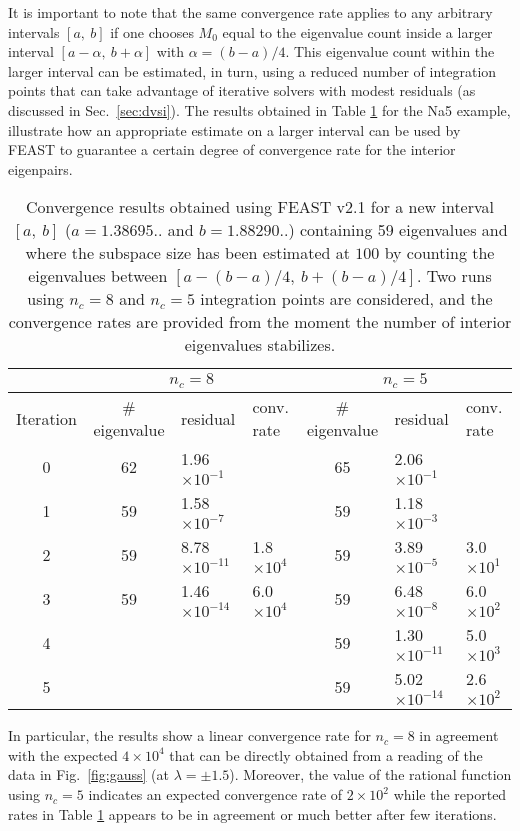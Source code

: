 \documentclass[12pt]{article}		\usepackage{tabls,multirow}
\newcommand{\ab}{[a, \ b]}
\begin{document}
It is important to note that the same convergence rate applies to any
arbitrary intervals $\ab$ if one chooses $M_0$ equal to the eigenvalue
count inside a larger interval $[a-\alpha, \ b+\alpha]$ with
$\alpha=(b-a)/4$. This eigenvalue count within the larger interval
can be estimated, in turn, using a reduced number of integration
points that can take advantage of iterative solvers with modest
residuals (as discussed in Sec.~\ref{sec:dvsi}).  The results obtained
in Table \ref{tab:feastruns} for the Na5 example, illustrate how an
appropriate estimate on a larger interval can be used by FEAST to
guarantee a certain degree of convergence rate for the interior
eigenpairs.
\begin{table}[htbp]
\begin{center}
\begin{small}
\begin{tabular}{c|cll|cll}
   \multicolumn{1}{c}{}    & \multicolumn{3}{c}{$n_c=8$} & \multicolumn{3}{c}{$n_c=5$} \\ \hline\hline
Iteration     & \# eigenvalue & residual & conv. rate &  \# eigenvalue & residual & conv. rate  \\
0   &    62   &   1.96$\times10^{-1}$ &                    & 65 & 2.06$\times10^{-1}$ &  \\
1   &    59   &   1.58$\times10^{-7}$ &                    & 59 &1.18$\times10^{-3}$ &   \\
2   &    59   &   8.78$\times10^{-11}$ & 1.8$\times10^{4}$  & 59 & 3.89$\times10^{-5}$ & 3.0$\times10^{1}$   \\
3   &    59   &   1.46$\times10^{-14}$ & 6.0$\times10^{4}$  & 59 & 6.48$\times10^{-8}$ & 6.0$\times10^{2}$  \\
4    &         &            &                             & 59 &1.30$\times10^{-11}$ & 5.0$\times10^{3}$   \\
5    &         &            &                             & 59 & 5.02$\times10^{-14}$ & 2.6$\times10^{2}$    \\ \hline \hline
\end{tabular}
\end{small}
\caption{\label{tab:feastruns} Convergence results obtained using
  FEAST v2.1 for a new interval $\ab$ ($a=1.38695..$ and
  $b=1.88290..$) containing 59 eigenvalues and where the subspace size
  has been estimated at $100$ by counting the eigenvalues between
  $[a-(b-a)/4, \ b+(b-a)/4]$.  Two runs using $n_c=8$ and $n_c=5$
  integration points are considered, and the convergence rates are
  provided from the moment the number of interior eigenvalues
  stabilizes.}
\end{center}
\end{table}
In particular, the results show a linear convergence rate for $n_c=8$
in agreement with the expected $4\times 10^{4}$ that can be directly
obtained from a reading of the data in Fig.~\ref{fig:gauss} (at
$\lambda=\pm1.5$).  Moreover, the value of the rational function using
$n_c=5$ indicates an expected convergence rate of $2\times 10^{2}$
while the reported rates in Table \ref{tab:feastruns} appears to be in
agreement or much better after few iterations.
\end{document}
